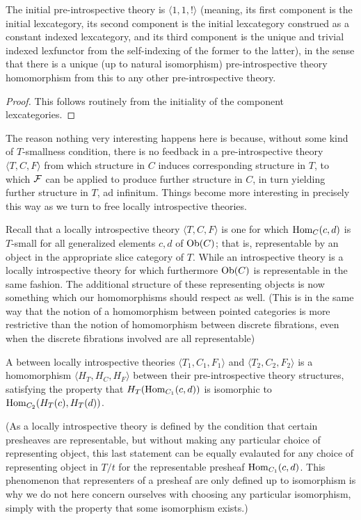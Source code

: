 \begin{theorem}
The initial pre-introspective theory is $\langle 1, 1, !\rangle$ (meaning, its first component is the initial lexcategory, its second component is the initial lexcategory construed as a constant indexed lexcategory, and its third component is the unique and trivial indexed lexfunctor from the self-indexing of the former to the latter), in the sense that there is a unique (up to natural isomorphism) pre-introspective theory homomorphism from this to any other pre-introspective theory.
\end{theorem}
\begin{proof}
This follows routinely from the initiality of the component lexcategories.
\end{proof}

The reason nothing very interesting happens here is because, without some kind of $T$-smallness condition, there is no feedback in a pre-introspective theory $\langle T, C, F \rangle$ from which structure in $C$ induces corresponding structure in $T$, to which $\mathcal{F}$ can be applied to produce further structure in $C$, in turn yielding further structure in $T$, ad infinitum. Things become more interesting in precisely this way as we turn to free locally introspective theories.

Recall that a locally introspective theory $\langle T, C, F \rangle$ is one for which $\operatorname{Hom}_C(c, d)$ is $T$-small for all generalized elements $c, d$ of $\operatorname{Ob}(C)$; that is, representable by an object in the appropriate slice category of $T$. While an introspective theory is a locally introspective theory for which furthermore $\operatorname{Ob}(C)$ is representable in the same fashion. The additional structure of these representing objects is now something which our homomorphisms should respect as well. (This is in the same way that the notion of a homomorphism between pointed categories is more restrictive than the notion of homomorphism between discrete fibrations, even when the discrete fibrations involved are all representable)

\begin{definition}
A  between locally introspective theories $\langle T_1, C_1, F_1 \rangle$ and $\langle T_2, C_2, F_2 \rangle$ is a homomorphism $\langle H_T, H_C, H_F \rangle$ between their pre-introspective theory structures, satisfying the property that $H_T(\operatorname{Hom}_{C_1}(c, d))$ is isomorphic to $\operatorname{Hom}_{C_2}(H_T(c), H_T(d))$.


(As a locally introspective theory is defined by the condition that certain presheaves are representable, but without making any particular choice of representing object, this last statement can be equally evalauted for any choice of representing object in $T/t$ for the representable presheaf $\operatorname{Hom}_{C_1}(c, d)$. This phenomenon that representers of a presheaf are only defined up to isomorphism is why we do not here concern ourselves with choosing any particular isomorphism, simply with the property that some isomorphism exists.)
\end{definition}

